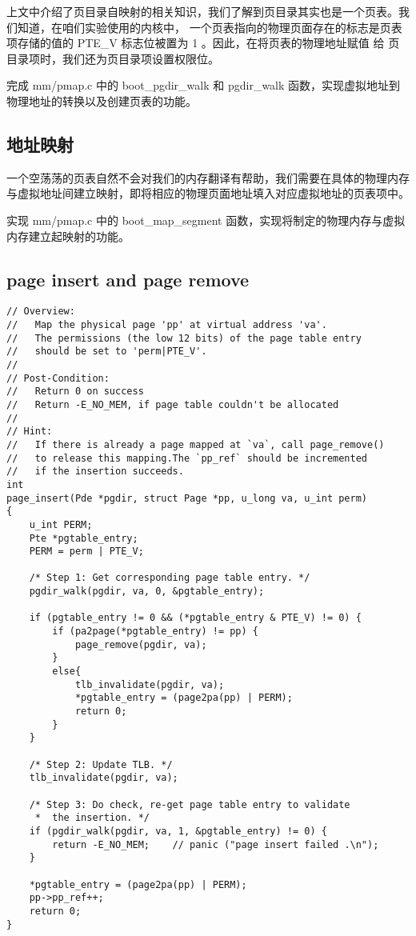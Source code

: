 上文中介绍了页目录自映射的相关知识，我们了解到页目录其实也是一个页表。我们知道，在咱们实验使用的内核中，
一个页表指向的物理页面存在的标志是页表项存储的值的 PTE\_V 标志位被置为 1 。因此，在将页表的物理地址赋值
给 页目录项时，我们还为页目录项设置权限位。

\begin{exercise}
完成 mm/pmap.c 中的 boot\_pgdir\_walk 和 pgdir\_walk 函数，实现虚拟地址到物理地址的转换以及创建页表的功能。
\end{exercise}

\subsection{地址映射}
一个空荡荡的页表自然不会对我们的内存翻译有帮助，我们需要在具体的物理内存与虚拟地址间建立映射，即将相应的物理页面地址填入对应虚拟地址的页表项中。
\begin{exercise}
实现 mm/pmap.c 中的 boot\_map\_segment 函数，实现将制定的物理内存与虚拟内存建立起映射的功能。
\end{exercise}

\subsection{page insert and page remove}

\begin{verbatim}
// Overview:
//   Map the physical page 'pp' at virtual address 'va'.
//   The permissions (the low 12 bits) of the page table entry
//   should be set to 'perm|PTE_V'.
//
// Post-Condition:
//   Return 0 on success
//   Return -E_NO_MEM, if page table couldn't be allocated
//
// Hint:
//   If there is already a page mapped at `va`, call page_remove()
//   to release this mapping.The `pp_ref` should be incremented
//   if the insertion succeeds.
int
page_insert(Pde *pgdir, struct Page *pp, u_long va, u_int perm)
{
	u_int PERM;
	Pte *pgtable_entry;
	PERM = perm | PTE_V;

	/* Step 1: Get corresponding page table entry. */
	pgdir_walk(pgdir, va, 0, &pgtable_entry);

	if (pgtable_entry != 0 && (*pgtable_entry & PTE_V) != 0) {
		if (pa2page(*pgtable_entry) != pp) {
			page_remove(pgdir, va);
		}
		else{
			tlb_invalidate(pgdir, va);
			*pgtable_entry = (page2pa(pp) | PERM);
			return 0;
		}
	}

	/* Step 2: Update TLB. */
	tlb_invalidate(pgdir, va);

	/* Step 3: Do check, re-get page table entry to validate
	 *  the insertion. */
	if (pgdir_walk(pgdir, va, 1, &pgtable_entry) != 0) {
		return -E_NO_MEM;    // panic ("page insert failed .\n");
	}

	*pgtable_entry = (page2pa(pp) | PERM);
	pp->pp_ref++;
	return 0;
}
\end{verbatim}


